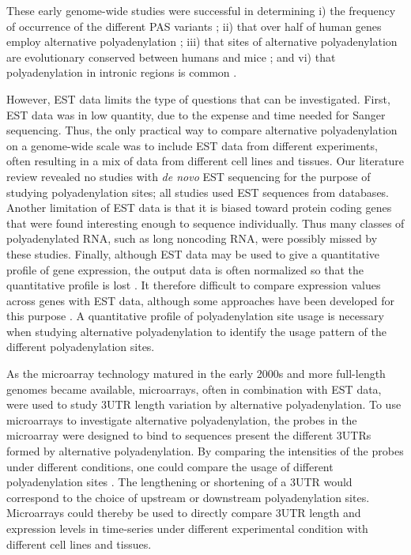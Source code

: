 These early genome-wide studies were successful in determining i) the frequency
of occurrence of the different PAS variants \cite{beaudoing_patterns_2000}; ii)
that over half of human genes employ alternative polyadenylation
\cite{tian_large-scale_2005}; iii) that sites of alternative polyadenylation
are evolutionary conserved between humans and mice
\cite{tian_large-scale_2005}; and vi) that polyadenylation in intronic regions
is common \cite{tian_widespread_2007}.

However, EST data limits the type of questions that can be investigated. First,
EST data was in low quantity, due to the expense and time needed for Sanger
sequencing. Thus, the only practical way to compare alternative polyadenylation
on a genome-wide scale was to include EST data from different experiments,
often resulting in a mix of data from different cell lines and tissues. Our
literature review revealed no studies with \textit{de novo} EST sequencing for
the purpose of studying polyadenylation sites; all studies used EST sequences
from databases. Another limitation of EST data is that it is biased toward
protein coding genes that were found interesting enough to sequence
individually. Thus many classes of polyadenylated RNA, such as long noncoding
RNA, were possibly missed by these studies. Finally, although EST data may be
used to give a quantitative profile of gene expression, the output data is
often normalized so that the quantitative profile is lost
\cite{liu_quantitative_2006}. It therefore difficult to compare expression
values across genes with EST data, although some approaches have been developed
for this purpose \cite{liu_quantitative_2006}. A quantitative profile of
polyadenylation site usage is necessary when studying alternative polyadenylation to
identify the usage pattern of the different polyadenylation sites.

As the microarray technology matured in the early 2000s and more full-length
genomes became available, microarrays, often in combination with EST data, were
used to study 3\ppp UTR length variation by alternative polyadenylation.  To
use microarrays to investigate alternative polyadenylation, the probes in the
microarray were designed to bind to sequences present the different 3\ppp UTRs
formed by alternative polyadenylation. By comparing the intensities of the
probes under different conditions, one could compare the usage of different
polyadenylation sites \cite{sandberg_proliferating_2008, ji_progressive_2009}.
The lengthening or shortening of a 3\ppp UTR would correspond to the choice of
upstream or downstream polyadenylation sites. Microarrays could thereby be used to
directly compare 3\ppp UTR length and expression levels in time-series under
different experimental condition with different cell lines and tissues.

